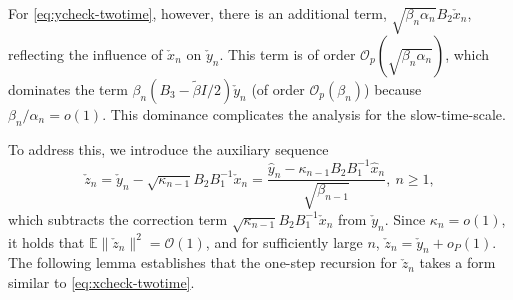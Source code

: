 \documentclass[11pt]{article}
\theoremstyle{plain}
\theoremstyle{definition}
\def\invdiffslow{\tilde{\beta}}
\def\mI{{\bm{I}}}
\def\OM{{\mathcal O}}
\def\EB{{\mathbb E}}
\newcommand{\xhat}{{\hat{x}}}
\newcommand{\yhat}{{\hat{y}}}
\newcommand{\xcheck}{{\check{x}}}
\newcommand{\ycheck}{{\check{y}}}
\newcommand{\zcheck}{{\check{z}}}
\newcommand{\xx}{{x}}
\newcommand{\yy}{{y}}
\def\mI{{I}}
\def\oprob{{{o}_P}}
\begin{document}
For \eqref{eq:ycheck-twotime}, however, there is an additional term, $\sqrt{ \beta_{n} \alpha_{n} } B_2 \xcheck_{n}$, reflecting the influence of $\xcheck_{n}$ on $\ycheck_{n}$.
This term is of order $\OM_p( \sqrt{\beta_{n} \alpha_{n}} )$, which dominates the term $ \beta_{n} (B_3 - \invdiffslow \mI / 2) \ycheck_{n} $ (of order $\OM_p(\beta_{n}) $)
because $\beta_{n} / \alpha_{n} = o(1)$.
This dominance complicates the analysis for the slow-time-scale.

To address this, we introduce the auxiliary sequence
\begin{equation}\label{eq:zcheck-def}
	\zcheck_{n} = \ycheck_{n} - \sqrt{ \kappa_{n-1} } B_2 B_1^{-1} \xcheck_{n}
	= \frac{ \yhat_{n} - \kappa_{n-1} B_2 B_1^{-1} \xhat_{n} }{ \sqrt{\beta_{n-1}} }, \ n \ge 1,
\end{equation}
which subtracts the correction term $\sqrt{\kappa_{n-1}} B_2 B_1^{-1} \xcheck_{n}$ from $\ycheck_{n}$.
Since $\kappa_{n} = o(1)$, it holds that $\EB \| \zcheck_{n} \|^2 = \OM(1)$, and for sufficiently large $n$, $\zcheck_{n} = \ycheck_{n} + \oprob(1)$.
The following lemma establishes that the one-step recursion for $\zcheck_{n}$ takes a form similar to \eqref{eq:xcheck-twotime}.
\end{document}
